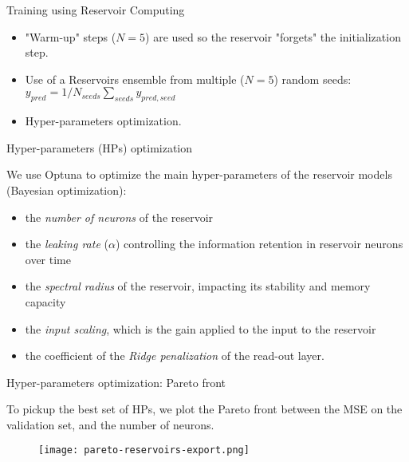 \documentclass{beamer}
\begin{document}
\begin{frame}{Training using Reservoir Computing}


\begin{itemize}
	\item "Warm-up" steps ($N=5$) are used so the reservoir "forgets" the initialization step. \\
	\item Use of a Reservoirs ensemble from multiple ($N=5$) random seeds: $y_{pred} = 1/N_{seeds} \sum_{seeds}{y_{pred,seed}}$ \\
	\item Hyper-parameters optimization. 
\end{itemize}


\end{frame}


\begin{frame}{Hyper-parameters (HPs) optimization}

We use Optuna to optimize the main hyper-parameters of the reservoir models (Bayesian optimization):
\begin{itemize}
    \item the \textit{number of neurons} of the reservoir
    \item the \textit{leaking rate} ($\alpha$) controlling the information retention in reservoir neurons over time
    \item the \textit{spectral radius} of the reservoir, impacting its stability and memory capacity
    \item the \textit{input scaling}, which is the gain applied to the input to the reservoir
    \item the coefficient of the \textit{Ridge penalization} of the read-out layer.
\end{itemize}

\end{frame}



\begin{frame}{Hyper-parameters optimization: Pareto front}

To pickup the best set of HPs, we plot the Pareto front between the MSE on the validation set, and the number of neurons.

\begin{figure}
    \centering
    \texttt{[image: pareto-reservoirs-export.png]}
\end{figure}

\end{frame}
\end{document}
